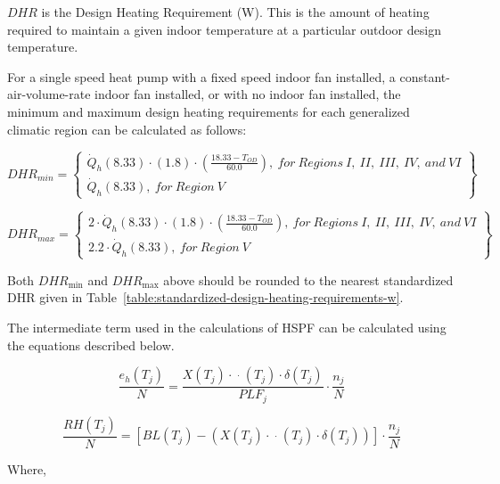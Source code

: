 \(DHR\) is the Design Heating Requirement (W). This is the amount of heating required to maintain a given indoor temperature at a particular outdoor design temperature.

For a single speed heat pump with a fixed speed indoor fan installed, a constant-air-volume-rate indoor fan installed, or with no indoor fan installed, the minimum and maximum design heating requirements for each generalized climatic region can be calculated as follows:

\begin{equation}
  DHR_{min} =
  \left\{ 
    \begin{array}{l}
      {\dot{Q}_h}(8.33) \cdot (1.8) \cdot \left( {\frac{{18.33 - {T_{OD}}}}{{60.0}}} \right), {~for~Regions~I,~II,~III,~IV,~and~VI} \\
      {\dot{Q}_h}(8.33),{~for~Region~V}
    \end{array}
  \right\}
\end{equation}

\begin{equation}
  DHR_{max} =
  \left\{ 
    \begin{array}{l}
      {2 \cdot \dot{Q}_h}(8.33) \cdot (1.8) \cdot \left( {\frac{{18.33 - {T_{OD}}}}{{60.0}}} \right), {~for~Regions~I,~II,~III,~IV,~and~VI} \\
      {2.2 \cdot \dot{Q}_h}(8.33),{~for~Region~V}
    \end{array}
  \right\}
\end{equation}

Both \(DH{R_{\min }}\) and \(DH{R_{\max }}\) above should be rounded to the nearest standardized DHR given in Table~\ref{table:standardized-design-heating-requirements-w}.

The intermediate term used in the calculations of HSPF can be calculated using the equations described below.

\begin{equation}
\frac{{{e_h}({T_j})}}{N} = \frac{{X({T_j}) \cdot \mathop {{E_h}}\limits^ \cdot  ({T_j}) \cdot \delta ({T_j})}}{{PL{F_j}}} \cdot \frac{{{n_j}}}{N}
\end{equation}

\begin{equation}
\frac{{RH({T_j})}}{N} = \left[ {BL({T_j}) - \left( {X({T_j}) \cdot \mathop {{Q_h}}\limits^ \cdot  ({T_j}) \cdot \delta ({T_j})} \right)} \right] \cdot \frac{{{n_j}}}{N}
\end{equation}

Where,

